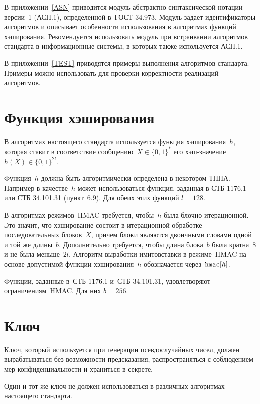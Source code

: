 В приложении~\ref{ASN} приводится модуль
абстрактно-синтаксической нотации версии~1 (АСН.1),
определенной в~ГОСТ 34.973.
Модуль задает идентификаторы алгоритмов и 
описывает особенности использования в алгоритмах 
функций хэширования.
%
Рекомендуется использовать модуль 
при встраивании алгоритмов стандарта в информационные системы, 
в которых также используется АСН.1.

В приложении~\ref{TEST} приводятся примеры выполнения алгоритмов стандарта.
Примеры можно использовать для проверки корректности 
реализаций алгоритмов.

\section{Функция хэширования}\label{COMMON.Hash}

В алгоритмах настоящего стандарта используется функция хэширования~$h$,
которая ставит в соответствие сообщению~$X\in\{0,1\}^*$ 
его хэш-значение~$h(X)\in\{0,1\}^{2l}$.
%

Функция~$h$ должна быть алгоритмически определена в некотором ТНПА. 
Например в качестве~$h$ может использоваться функция, 
заданная в СТБ 1176.1 или СТБ 34.101.31 (пункт~6.9).
Для обеих этих функций $l=128$.

В алгоритмах режимов~HMAC требуется, чтобы~$h$ была 
блочно-итерационной. Это значит, что хэширование состоит в итерационной 
обработке последовательных блоков~$X$,
причем блоки являются двоичными словами одной и той же длины~$b$.
%
Дополнительно требуется, чтобы длина блока~$b$ была кратна~$8$ и не была 
меньше~$2l$.
%
Алгоритм выработки имитовставки в режиме~HMAC на основе допустимой функции 
хэширования~$h$ обозначается через~$\texttt{hmac}[h]$.

Функции, заданные в~СТБ 1176.1 и~СТБ 34.101.31, удовлетворяют ограничениям~HMAC. 
Для них $b=256$.

\section{Ключ}\label{COMMON.Key}

Ключ, который используется при генерации псевдослучайных чисел,
должен вырабатываться без возможности предсказания, 
распространяться с соблюдением мер конфиденциальности и храниться в секрете.

Один и тот же ключ не должен использоваться в различных алгоритмах
настоящего стандарта.

